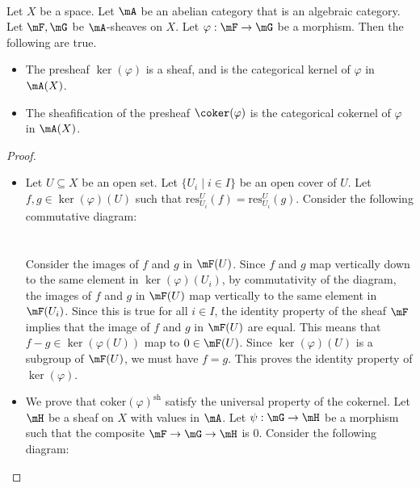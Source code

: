 \documentclass[a4paper]{article}
\begin{document}
\begin{prp}{}{}\\
Let $X$ be a space. Let $\mA$ be an abelian category that is an algebraic category. Let $\mF,\mG$ be $\mA$-sheaves on $X$. Let $\varphi:\mF\to\mG$ be a morphism. Then the following are true. 
\begin{itemize}
\item The presheaf $\ker(\varphi)$ is a sheaf, and is the categorical kernel of $\varphi$ in $\mA(X)$. 
\item The sheafification of the presheaf $\coker(\varphi)$ is the categorical cokernel of $\varphi$ in $\mA(X)$. 
\end{itemize}
\begin{proof}
\begin{itemize}
\item Let $U\subseteq X$ be an open set. Let $\{U_i\;|\;i\in I\}$ be an open cover of $U$. Let $f,g\in\ker(\varphi)(U)$ such that $\text{res}_{U_i}^U(f)=\text{res}_{U_i}^U(g)$. Consider the following commutative diagram: \\
 \\~\\
Consider the images of $f$ and $g$ in $\mF(U)$. Since $f$ and $g$ map vertically down to the same element in $\ker(\varphi)(U_i)$, by commutativity of the diagram, the images of $f$ and $g$ in $\mF(U)$ map vertically to the same element in $\mF(U_i)$. Since this is true for all $i\in I$, the identity property of the sheaf $\mF$ implies that the image of $f$ and $g$ in $\mF(U)$ are equal. This means that $f-g\in\ker(\varphi(U))$ map to $0\in\mF(U)$. Since $\ker(\varphi)(U)$ is a subgroup of $\mF(U)$, we must have $f=g$. This proves the identity property of $\ker(\varphi)$. 
\item We prove that $\text{coker}(\varphi)^\text{sh}$ satisfy the universal property of the cokernel. Let $\mH$ be a sheaf on $X$ with values in $\mA$. Let $\psi:\mG\to\mH$ be a morphism such that the composite $\mF\to\mG\to\mH$ is $0$. Consider the following diagram: \\
\end{itemize}
\end{proof}
\end{prp}
\end{document}
